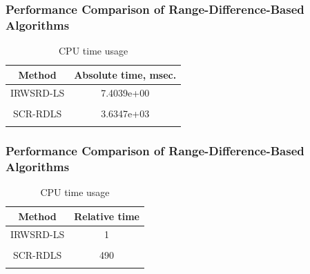 \documentclass [t] {beamer} %
\begin{document}
\begin{frame} %
\frametitle{Performance Comparison of Range-Difference-Based Algorithms}
\begin{table}
\phantom{m}
\caption{CPU time usage}
\begin{tabular}{||c|c||} 
\hhline{|t:==:t|}
Method &  Absolute time, msec.\\ \hline
IRWSRD-LS  & 7.4039e+00 \\&\\
SCR-RDLS &  3.6347e+03  \\ %
\hhline{|b:==:b|} 
\end{tabular}
\end{table}
\end{frame}


\begin{frame} %
\frametitle{Performance Comparison of Range-Difference-Based Algorithms}
\begin{table}
\phantom{m}
\caption{CPU time usage}
\begin{tabular}{||c|c||} 
\hhline{|t:==:t|}
Method &  Relative time\\ \hline
 IRWSRD-LS  & 1 \\&\\
SCR-RDLS &  490  \\ %
\hhline{|b:==:b|} 
\end{tabular}
\end{table}
\end{frame}



%
%

\end{document}
